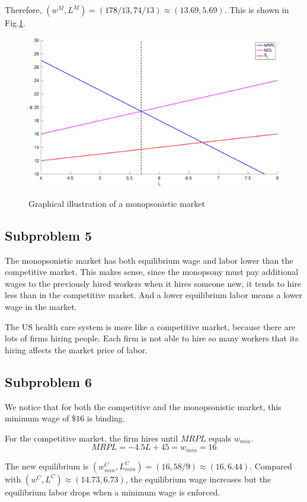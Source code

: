 \documentclass{article}
\begin{document}
Therefore, $(w^M,L^M)=(178/13,74/13)\approx(13.69,5.69)$. This is shown in Fig.\ref{fig2}.
\begin{figure}[!htbp]
	\centering
	\includegraphics[width=12cm]{fig2.eps}\\
	\caption{Graphical illustration of a monopsonistic market}\label{fig2}
\end{figure}

\subsection{Subproblem 5}
The monopsonistic market has both equilibrium wage and labor lower than the competitive market. This makes sense, since the monopsony must pay additional wages to the previously hired workers when it hires someone new, it tends to hire less than in the competitive market. And a lower equilibrium labor means a lower wage in the market.

The US health care system is more like a competitive market, because there are lots of firms hiring people. Each firm is not able to hire so many workers that its hiring affects the market price of labor.

\subsection{Subproblem 6}
We notice that for both the competitive and the monopsonistic market, this minimum wage of $\$16$ is binding.

For the competitive market, the firm hires until $MRPL$ equals $w_{min}$.
\begin{equation*}
	MRPL=-4.5L+45=w_{min}=16
\end{equation*}

The new equilibrium is $(w_{min}^C,L_{min}^C)=(16,58/9)\approx(16,6.44)$. Compared with $(w^C,L^C)\approx(14.73,6.73)$, the equilibrium wage increases but the equilibrium labor drops when a minimum wage is enforced.
\end{document}
